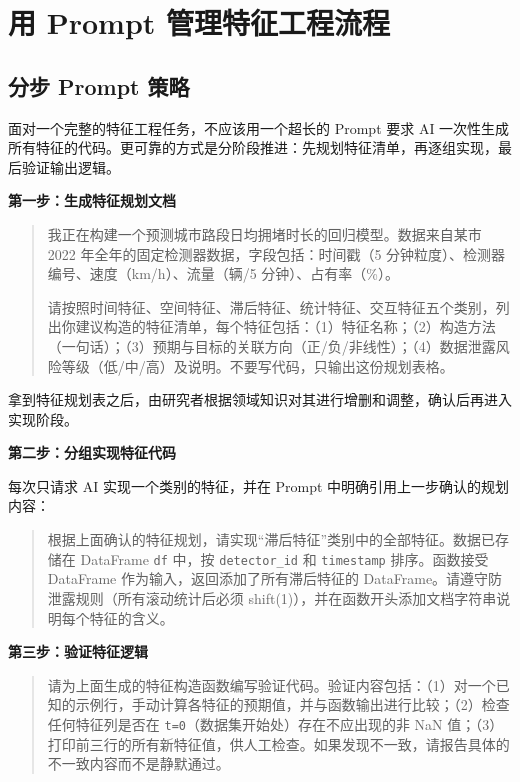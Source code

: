 \section{用 Prompt 管理特征工程流程}

\subsection{分步 Prompt 策略}

面对一个完整的特征工程任务，不应该用一个超长的 Prompt 要求 AI 一次性生成所有特征的代码。更可靠的方式是分阶段推进：先规划特征清单，再逐组实现，最后验证输出逻辑。

\textbf{第一步：生成特征规划文档}

\begin{quote}
我正在构建一个预测城市路段日均拥堵时长的回归模型。数据来自某市 2022 年全年的固定检测器数据，字段包括：时间戳（5 分钟粒度）、检测器编号、速度（km/h）、流量（辆/5 分钟）、占有率（\%）。

请按照时间特征、空间特征、滞后特征、统计特征、交互特征五个类别，列出你建议构造的特征清单，每个特征包括：（1）特征名称；（2）构造方法（一句话）；（3）预期与目标的关联方向（正/负/非线性）；（4）数据泄露风险等级（低/中/高）及说明。不要写代码，只输出这份规划表格。
\end{quote}

拿到特征规划表之后，由研究者根据领域知识对其进行增删和调整，确认后再进入实现阶段。

\textbf{第二步：分组实现特征代码}

每次只请求 AI 实现一个类别的特征，并在 Prompt 中明确引用上一步确认的规划内容：

\begin{quote}
根据上面确认的特征规划，请实现“滞后特征”类别中的全部特征。数据已存储在 DataFrame \texttt{df} 中，按 \texttt{detector\_id} 和 \texttt{timestamp} 排序。函数接受 DataFrame 作为输入，返回添加了所有滞后特征的 DataFrame。请遵守防泄露规则（所有滚动统计后必须 shift(1)），并在函数开头添加文档字符串说明每个特征的含义。
\end{quote}

\textbf{第三步：验证特征逻辑}

\begin{quote}
请为上面生成的特征构造函数编写验证代码。验证内容包括：（1）对一个已知的示例行，手动计算各特征的预期值，并与函数输出进行比较；（2）检查任何特征列是否在 \texttt{t=0}（数据集开始处）存在不应出现的非 NaN 值；（3）打印前三行的所有新特征值，供人工检查。如果发现不一致，请报告具体的不一致内容而不是静默通过。
\end{quote}

